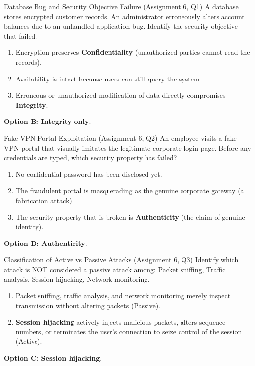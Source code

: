 \begin{solved}{Database Bug and Security Objective Failure (Assignment 6, Q1)}
\Given A database stores encrypted customer records. An administrator erroneously alters account balances due to an unhandled application bug. Identify the security objective that failed.
\Steps
\begin{enumerate}[leftmargin=*]
  \item Encryption preserves \textbf{Confidentiality} (unauthorized parties cannot read the records).
  \item Availability is intact because users can still query the system.
  \item Erroneous or unauthorized modification of data directly compromises \textbf{Integrity}.
\end{enumerate}
\Answer \textbf{Option B: Integrity only}.
\end{solved}

\begin{solved}{Fake VPN Portal Exploitation (Assignment 6, Q2)}
\Given An employee visits a fake VPN portal that visually imitates the legitimate corporate login page. Before any credentials are typed, which security property has failed?
\Steps
\begin{enumerate}[leftmargin=*]
  \item No confidential password has been disclosed yet.
  \item The fraudulent portal is masquerading as the genuine corporate gateway (a fabrication attack).
  \item The security property that is broken is \textbf{Authenticity} (the claim of genuine identity).
\end{enumerate}
\Answer \textbf{Option D: Authenticity}.
\end{solved}

\begin{solved}{Classification of Active vs Passive Attacks (Assignment 6, Q3)}
\Given Identify which attack is NOT considered a passive attack among: Packet sniffing, Traffic analysis, Session hijacking, Network monitoring.
\Steps
\begin{enumerate}[leftmargin=*]
  \item Packet sniffing, traffic analysis, and network monitoring merely inspect transmission without altering packets (Passive).
  \item \textbf{Session hijacking} actively injects malicious packets, alters sequence numbers, or terminates the user's connection to seize control of the session (Active).
\end{enumerate}
\Answer \textbf{Option C: Session hijacking}.
\end{solved}

